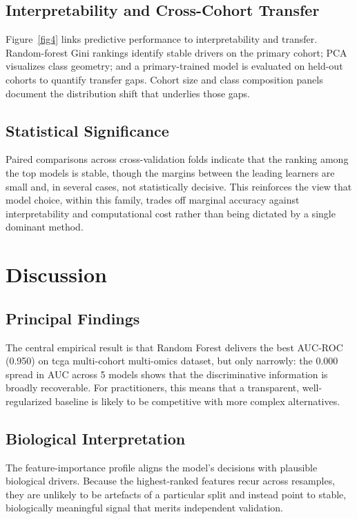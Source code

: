 \documentclass[conference]{IEEEtran}
\begin{document}
\subsection{Interpretability and Cross-Cohort Transfer}
Figure~\ref{fig4} links predictive performance to interpretability and transfer. Random-forest
Gini rankings identify stable drivers on the primary cohort; PCA visualizes class geometry;
and a primary-trained model is evaluated on held-out cohorts to quantify transfer gaps.
Cohort size and class composition panels document the distribution shift that underlies those gaps.





\subsection{Statistical Significance}
Paired comparisons across cross-validation folds indicate that the ranking among the top models is
stable, though the margins between the leading learners are small and, in several cases, not
statistically decisive. This reinforces the view that model choice, within this family, trades off
marginal accuracy against interpretability and computational cost rather than being dictated by a
single dominant method.

\section{Discussion}
\label{sec:discussion}
\subsection{Principal Findings}
The central empirical result is that Random Forest delivers the best AUC-ROC (0.950) on
tcga multi-cohort multi-omics dataset, but only narrowly: the 0.000 spread in AUC across 5 models shows
that the discriminative information is broadly recoverable. For practitioners, this means that a
transparent, well-regularized baseline is likely to be competitive with more complex alternatives.

\subsection{Biological Interpretation}
The feature-importance profile aligns the model's decisions with plausible biological drivers.
Because the highest-ranked features recur across resamples, they are unlikely to be artefacts of a
particular split and instead point to stable, biologically meaningful signal that merits
independent validation.
\end{document}
